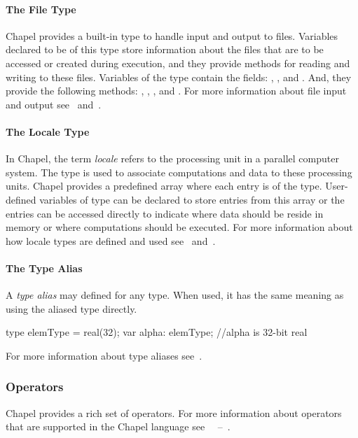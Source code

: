 \paragraph{The File Type}
Chapel provides a built-in  type to handle input and
output to files.  Variables declared to be of this type store
information about the files that are to be accessed or created during
execution, and they provide methods for reading and writing to these
files.  Variables of the  type contain the
fields:  , , and .
And, they provide the following methods:
, , ,  and .
For more information about file input and output see~ and~.

\paragraph{The Locale Type}
In Chapel, the term {\em locale} refers to the processing unit in a parallel
computer system.  The  type is used to associate 
computations and data to these processing units.  Chapel provides
a predefined array  where each entry is of the 
type.  User-defined variables of  type can be declared to store 
entries from this  array or the entries can be accessed 
directly to indicate where data should be reside in memory or where computations
should be executed.  For more information about how locale types are defined
and used see~ and~. 

\paragraph{The Type Alias}
A \emph{type alias} may defined for any type.  When used, it has the
same meaning as using the aliased type directly.
\begin{chapel}
type elemType = real(32);
var alpha: elemType; //alpha is 32-bit real
\end{chapel}
For more information about type aliases see~.

\subsubsection{Operators}
Chapel provides a rich set of operators.  For more information about
operators that are supported in the Chapel language 
see~ ~--~.

